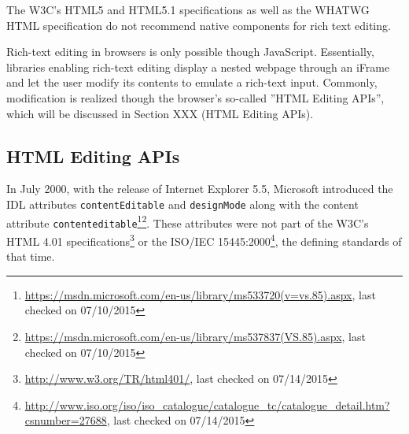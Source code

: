 The W3C's HTML5 and HTML5.1 specifications as well as the WHATWG HTML specification do not recommend native components for rich text editing. 

Rich-text editing in browsers is only possible though JavaScript. Essentially, libraries enabling rich-text editing display a nested webpage through an iFrame and let the user modify its contents to emulate a rich-text input. Commonly, modification is realized though the browser's so-called ''HTML Editing APIs'', which will be discussed in Section XXX (HTML Editing APIs).

\subsection{HTML Editing APIs}

In July 2000, with the release of Internet Explorer 5.5, Microsoft introduced the IDL attributes \texttt{contentEditable} and \texttt{designMode} along with the content attribute \texttt{contenteditable}\footnote{\url{https://msdn.microsoft.com/en-us/library/ms533720(v=vs.85).aspx}, last checked on 07/10/2015}\footnote{\url{https://msdn.microsoft.com/en-us/library/ms537837(VS.85).aspx}, last checked on 07/10/2015}. These attributes were not part of the W3C's HTML 4.01 specifications\footnote{\url{http://www.w3.org/TR/html401/}, last checked on 07/14/2015} or the ISO/IEC 15445:2000\footnote{\url{http://www.iso.org/iso/iso\_catalogue/catalogue\_tc/catalogue\_detail.htm?csnumber=27688}, last checked on 07/14/2015}, the defining standards of that time.

\begin{table}[]
\centering
{}
\caption{Editing API attributes}
\label{editing-api-attributes}
\end{table}

